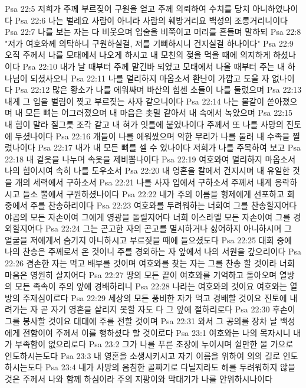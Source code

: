 Psa 22:5  저희가 주께 부르짖어 구원을 얻고 주께 의뢰하여 수치를 당치 아니하였나이다
Psa 22:6  나는 벌레요 사람이 아니라 사람의 훼방거리요 백성의 조롱거리니이다
Psa 22:7  나를 보는 자는 다 비웃으며 입술을 비쭉이고 머리를 흔들며 말하되
Psa 22:8  "저가 여호와께 의탁하니 구원하실걸, 저를 기뻐하시니 건지실걸 하나이다"
Psa 22:9  오직 주께서 나를 모태에서 나오게 하시고 내 모친의 젖을 먹을 때에 의지하게 하셨나이다
Psa 22:10  내가 날 때부터 주께 맡긴바 되었고 모태에서 나올 때부터 주는 내 하나님이 되셨사오니
Psa 22:11  나를 멀리하지 마옵소서 환난이 가깝고 도울 자 없나이다
Psa 22:12  많은 황소가 나를 에워싸며 바산의 힘센 소들이 나를 둘렀으며
Psa 22:13  내게 그 입을 벌림이 찢고 부르짖는 사자 같으니이다
Psa 22:14  나는 물같이 쏟아졌으며 내 모든 뼈는 어그러졌으며 내 마음은 촛밀 같아서 내 속에서 녹았으며
Psa 22:15  내 힘이 말라 질그릇 조각 같고 내 혀가 잇틀에 붙었나이다 주께서 또 나를 사망의 진토에 두셨나이다
Psa 22:16  개들이 나를 에워쌌으며 악한 무리가 나를 둘러 내 수족을 찔렀나이다
Psa 22:17  내가 내 모든 뼈를 셀 수 있나이다 저희가 나를 주목하여 보고
Psa 22:18  내 겉옷을 나누며 속옷을 제비뽑나이다
Psa 22:19  여호와여 멀리하지 마옵소서 나의 힘이시여 속히 나를 도우소서
Psa 22:20  내 영혼을 칼에서 건지시며 내 유일한 것을 개의 세력에서 구하소서
Psa 22:21  나를 사자 입에서 구하소서 주께서 내게 응락하시고 들소 뿔에서 구원하셨나이다
Psa 22:22  내가 주의 이름을 형제에게 선포하고 회중에서 주를 찬송하리이다
Psa 22:23  여호와를 두려워하는 너희여 그를 찬송할지어다 야곱의 모든 자손이여 그에게 영광을 돌릴지어다 너희 이스라엘 모든 자손이여 그를 경외할지어다
Psa 22:24  그는 곤고한 자의 곤고를 멸시하거나 싫어하지 아니하시며 그 얼굴을 저에게서 숨기지 아니하시고 부르짖을 때에 들으셨도다
Psa 22:25  대회 중에 나의 찬송은 주께로서 온 것이니 주를 경외하는 자 앞에서 나의 서원을 갚으리이다
Psa 22:26  겸손한 자는 먹고 배부를 것이며 여호와를 찾는 자는 그를 찬송 할 것이라 너희 마음은 영원히 살지어다
Psa 22:27  땅의 모든 끝이 여호와를 기억하고 돌아오며 열방의 모든 족속이 주의 앞에 경배하리니
Psa 22:28  나라는 여호와의 것이요 여호와는 열방의 주재심이로다
Psa 22:29  세상의 모든 풍비한 자가 먹고 경배할 것이요 진토에 내려가는 자 곧 자기 영혼을 살리지 못할 자도 다 그 앞에 절하리로다
Psa 22:30  후손이 그를 봉사할 것이요 대대에 주를 전할 것이며
Psa 22:31  와서 그 공의를 장차 날 백성에게 전함이여 주께서 이를 행하셨다 할 것이로다
Psa 23:1  여호와는 나의 목자시니 내가 부족함이 없으리로다
Psa 23:2  그가 나를 푸른 초장에 누이시며 쉴만한 물 가으로 인도하시는도다
Psa 23:3  내 영혼을 소생시키시고 자기 이름을 위하여 의의 길로 인도하시는도다
Psa 23:4  내가 사망의 음침한 골짜기로 다닐지라도 해를 두려워하지 않을 것은 주께서 나와 함께 하심이라 주의 지팡이와 막대기가 나를 안위하시나이다
